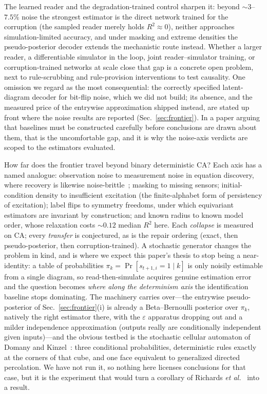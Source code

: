 \documentclass[aip,cha,amsmath,amssymb,reprint,floatfix]{revtex4-2}
\newcommand{\rtwo}{$R^2$}
\begin{document}
The learned reader and the degradation-trained control sharpen it: beyond
${\sim}3$--$7.5\%$ noise the strongest estimator is the direct network
trained for the corruption (the sampled reader merely holds
\rtwo{}${\approx}0$), neither approaches simulation-limited accuracy, and
under masking and extreme densities the pseudo-posterior decoder extends the
mechanistic route instead. Whether a larger reader, a differentiable simulator
in the loop, joint reader--simulator training, or corruption-trained networks
at scale close that gap is a concrete open problem, next to rule-scrubbing and
rule-provision interventions to test causality. One
omission we regard as the most consequential: the correctly specified
latent-diagram decoder for bit-flip noise, which we did not build; its
absence, and the measured price of the entrywise approximation shipped
instead, are stated up front where the noise results are reported
(Sec.~\ref{sec:frontier}). In a paper arguing that baselines must be constructed carefully
before conclusions are drawn about them, that is the uncomfortable gap, and it
is why the noise-axis verdicts are scoped to the estimators evaluated.

How far does the frontier travel beyond binary deterministic CA? Each axis has
a named analogue: observation noise to measurement noise in equation discovery, where
recovery is likewise noise-brittle~\cite{brunton2016}; masking to missing
sensors; initial-condition density to insufficient excitation (the
finite-alphabet form of persistency of excitation); label flips to symmetry
freedoms, under which
equivariant estimators are invariant by construction; and known radius to
known model order, whose relaxation costs ${\sim}0.12$ median \rtwo{} here. Each \emph{collapse} is
measured on CA; every \emph{transfer} is conjectured, as is the repair
ordering (exact, then pseudo-posterior, then corruption-trained). A stochastic
generator changes the problem in kind, and is where we expect
this paper's thesis to stop being a near-identity: a table of probabilities
$\pi_k=\Pr[s_{t+1,i}{=}1\mid k]$ is only noisily estimable from a single
diagram, so read-then-simulate acquires genuine estimation error and the
question becomes \emph{where along the determinism axis} the identification
baseline stops dominating. The machinery carries over---the entrywise
pseudo-posterior of Sec.~\ref{sec:frontier}(i) is already a Beta--Bernoulli
posterior over $\pi_k$, natively the right estimator there, with the
$\varepsilon$ apparatus dropping out and a milder independence
approximation (outputs really are conditionally independent given
inputs)---and the
obvious testbed is the stochastic cellular automaton of Domany and
Kinzel~\cite{domanykinzel1984}: three conditional probabilities,
deterministic rules exactly at the corners of that cube, and one face
equivalent to generalized directed
percolation. We have not run it, so nothing here licenses conclusions for
that case, but it is the experiment that would turn a corollary of
Richards \emph{et al.}~\cite{richards1990} into a result.
\end{document}
